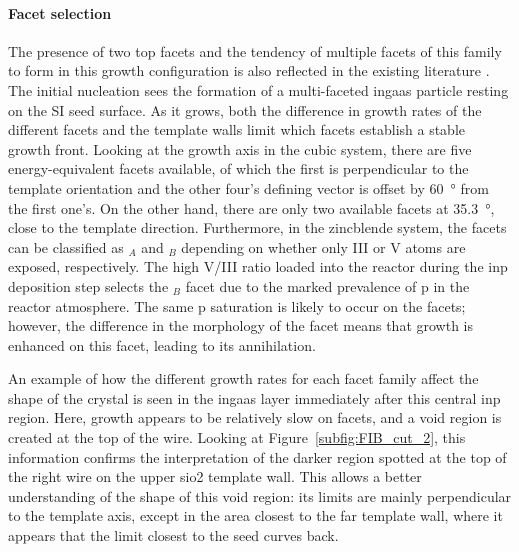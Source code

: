 \paragraph{Facet selection} The presence of two top  facets and the tendency of multiple facets of this family to form in this growth configuration is also reflected in the existing literature \cite{Schmid2015, Knoedler2017, Borg2015, Borg2014}. The initial nucleation sees the formation of a multi-faceted \acs{ingaas} particle resting on the \acl{SI} seed surface. As it grows, both the difference in growth rates of the different facets and the template walls limit which facets establish a stable growth front. Looking at the \hkl[1 1 0] growth axis in the cubic system, there are five energy-equivalent  facets available, of which the first is perpendicular to the template orientation and the other four's defining vector is offset by \qty{60}{\degree} from the first one's. On the other hand, there are only two available  facets at \qty{35.3}{\degree}, close to the template direction. Furthermore, in the zincblende system, the  facets can be classified as \(_A\) and \(_B\) depending on whether only III or V atoms are exposed, respectively. The high V/III ratio loaded into the reactor during the \acs{inp} deposition step selects the \(_B\) facet due to the marked prevalence of \acl{p} in the reactor atmosphere. The same \acl{p} saturation is likely to occur on the  facets; however, the difference in the morphology of the facet means that growth is enhanced on this facet, leading to its annihilation.

An example of how the different growth rates for each facet family affect the shape of the crystal is seen in the \acs{ingaas} layer immediately after this central \acs{inp} region. Here, growth appears to be relatively slow on  facets, and a void region is created at the top of the wire. Looking at Figure~\ref{subfig:FIB_cut_2}, this information confirms the interpretation of the darker region spotted at the top of the right wire on the upper \acs{sio2} template wall. This allows a better understanding of the shape of this void region: its limits are mainly perpendicular to the template axis, except in the area closest to the far template wall, where it appears that the limit closest to the seed curves back.
\par

